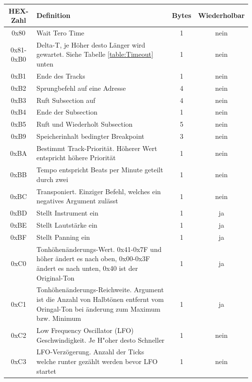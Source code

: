 \documentclass[11pt,a4paper]{scrartcl}
\begin{document}
\newpage
\begin{table}[!h]
    \centering
    \begin{tabular}{ c | p{11cm}| c | c}
        \textbf{HEX-Zahl} & \textbf{Definition} & \textbf{Bytes} & \textbf{Wiederholbar}\\
        \hline
        0x80 & Wait Tero Time & 1 & nein\\
        \hline
        0x81-0xB0 & Delta-T, je H\"oher desto L\"anger wird gewartet. Siehe Tabelle \ref{table:Timeout} unten & 1 & nein\\
        \hline
        0xB1 & Ende des Tracks& 1 & nein\\
				\hline
        0xB2 & Sprungbefehl auf eine Adresse& 4 & nein\\
				\hline
        0xB3 & Ruft Subsection auf & 4 & nein\\
				\hline
        0xB4 & Ende der Subsection & 1 & nein\\
				\hline
        0xB5 & Ruft und Wiederholt Subsection & 5 & nein\\
				\hline
				0xB9 & Speicherinhalt bedingter Breakpoint & 3 & nein\\
				\hline
        0xBA & Bestimmt Track-Priorit\"at. H\"oherer Wert entspricht h\"ohere Priorit\"at & 1 & nein\\
				\hline
        0xBB & Tempo entspricht Beats per Minute geteilt durch zwei & 1 & nein\\
				\hline
        0xBC & Transponiert. Einziger Befehl, welches ein negatives Argument zul\"asst & 1 & nein\\
				\hline
        0xBD & Stellt Instrument ein & 1 & ja\\
				\hline
        0xBE & Stellt Lautst\"arke ein & 1 & ja\\
				\hline
        0xBF & Stellt Panning ein & 1 & ja\\
				\hline
        0xC0 & Tonh\"ohen\"anderungs-Wert. 0x41-0x7F und h\"oher \"andert es nach oben, 0x00-0x3F \"andert es nach unten, 0x40 ist der Original-Ton& 1 & ja\\
				\hline
        0xC1 & Tonh\"ohen\"anderungs-Reichweite. Argument ist die Anzahl von Halbt\"onen entfernt vom Oringal-Ton bei \"anderung zum Maximum bzw. Minimum& 1 & ja\\
				\hline
        0xC2 & Low Frequency Oscillator (LFO) Geschwindigkeit. Je H"{o}her desto Schneller & 1 & nein\\
				\hline
        0xC3 & LFO-Verz\"ogerung. Anzahl der Ticks welche runter gez\"ahlt werden bevor LFO startet & 1 & nein\\

\end{tabular}
\end{table}
\end{document}
